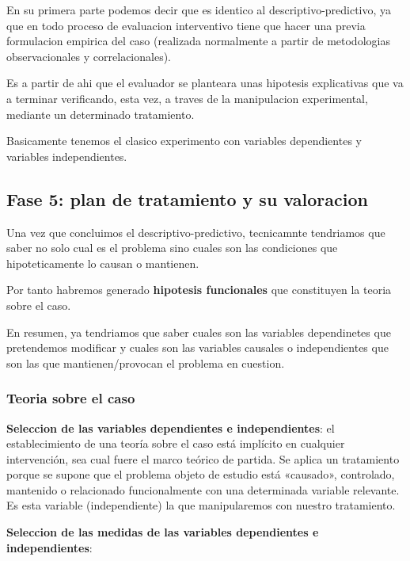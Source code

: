 \documentclass[12pt,a4paper]{article}
\begin{document}
En su primera parte podemos decir que es identico al descriptivo-predictivo, ya que en todo proceso de evaluacion interventivo tiene que hacer una previa formulacion empirica del caso (realizada normalmente a partir de metodologias observacionales y correlacionales).

Es a partir de ahi que el evaluador se planteara unas hipotesis explicativas que va a terminar verificando, esta vez, a traves de la manipulacion experimental, mediante un determinado tratamiento. 

Basicamente tenemos el clasico experimento con variables dependientes y variables independientes. 

\subsection{Fase 5: plan de tratamiento y su valoracion}%

Una vez que concluimos el descriptivo-predictivo, tecnicamnte tendriamos que saber no solo cual es el problema sino cuales son las condiciones que hipoteticamente lo causan o mantienen. 

Por tanto habremos generado \textbf{hipotesis funcionales} que constituyen la teoria sobre el caso.

En resumen, ya tendriamos que saber cuales son las variables dependinetes que pretendemos modificar y cuales son las variables causales o independientes que son las que mantienen/provocan el problema en cuestion.

\subsubsection{Teoria sobre el caso}%

\textbf{Seleccion de las variables dependientes e independientes}: el establecimiento de una teoría sobre el caso está implícito en cualquier intervención, sea cual fuere el marco teórico de partida. Se aplica un tratamiento porque se supone que el problema objeto de estudio está «causado», controlado, mantenido o relacionado funcionalmente con una determinada variable relevante. Es esta variable (independiente) la que manipularemos con nuestro tratamiento.

\textbf{Seleccion de las medidas de las variables dependientes e independientes}: 
\end{document}
